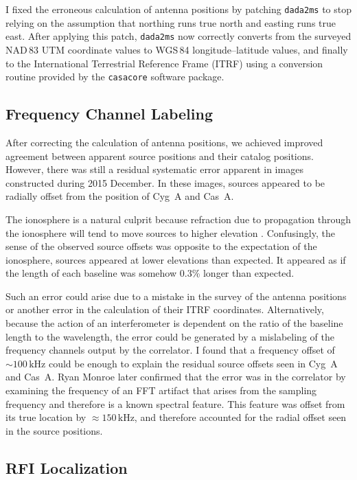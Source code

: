 \begin{bibunit}
I fixed the erroneous calculation of antenna positions by patching \texttt{dada2ms} to stop relying
on the assumption that northing runs true north and easting runs true east. After applying this
patch, \texttt{dada2ms} now correctly converts from the surveyed NAD\,83 UTM coordinate values to
WGS\,84 longitude--latitude values, and finally to the International Terrestrial Reference Frame
(ITRF) using a conversion routine provided by the \texttt{casacore} software package.

\subsection{Frequency Channel Labeling}

After correcting the calculation of antenna positions, we achieved improved agreement between
apparent source positions and their catalog positions. However, there was still a residual
systematic error apparent in images constructed during 2015 December. In these images, sources
appeared to be radially offset from the position of Cyg~A and Cas~A.

The ionosphere is a natural culprit because refraction due to propagation through the ionosphere
will tend to move sources to higher elevation \citep[e.g.,][]{2014MNRAS.437.1056V}. Confusingly, the
sense of the observed source offsets was opposite to the expectation of the ionosphere, sources
appeared at lower elevations than expected. It appeared as if the length of each baseline was
somehow 0.3\% longer than expected.

Such an error could arise due to a mistake in the survey of the antenna positions or another error
in the calculation of their ITRF coordinates. Alternatively, because the action of an interferometer
is dependent on the ratio of the baseline length to the wavelength, the error could be generated by
a mislabeling of the frequency channels output by the correlator. I found that a frequency offset of
$\sim 100\,\text{kHz}$ could be enough to explain the residual source offsets seen in Cyg~A and
Cas~A. Ryan Monroe later confirmed that the error was in the correlator by examining the frequency
of an FFT artifact that arises from the sampling frequency and therefore is a known spectral
feature. This feature was offset from its true location by $\approx150\,\text{kHz}$, and therefore
accounted for the radial offset seen in the source positions.

\subsection{RFI Localization}


\end{bibunit}
